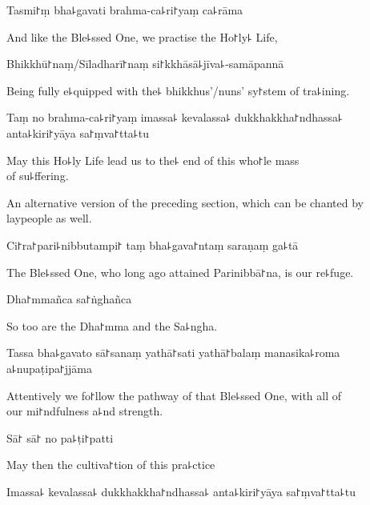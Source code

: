 Tasmi꜓ṃ bha꜕gavati brahma-ca꜕ri꜓yaṃ ca꜕rāma

\begin{english}
  And like the Ble꜕ssed One, we practise the Ho꜓ly꜕ Life,
\end{english}

Bhikkhū꜓naṃ/Sīladharī꜓naṃ si꜓kkhāsā꜕jīva꜕-samāpannā

\begin{english}
  Being fully e꜕quipped with the꜕ bhikkhus'/nuns' sy꜓stem of tra꜕ining.
\end{english}

Taṃ no brahma-ca꜕ri꜓yaṃ imassa꜕ kevalassa꜕ dukkhakkha꜓ndhassa꜕ anta꜕kiri꜓yāya sa꜓ṃva꜓tta꜕tu

\begin{english}
  May this Ho꜕ly Life lead us to the꜕ end of this who꜓le mass \\of su꜕ffering.
\end{english}

\begin{instruction}
  An alternative version of the preceding section, which can be chanted by laypeople as well.
\end{instruction}

Ci꜓ra꜓pari꜕nibbutampi꜓ taṃ bha꜕gava꜓ntaṃ saraṇaṃ ga꜕tā

\begin{english}
  The Ble꜕ssed One, who long ago attained Parinibbā꜓na, is our re꜕fuge.
\end{english}

Dha꜓mmañca sa꜓ṅghañca

\begin{english}
  So too are the Dha꜓mma and the Sa꜕ngha.
\end{english}

Tassa bha꜕gavato sā꜓sanaṃ yathā꜓sati yathā꜓balaṃ manasika꜕roma a꜕nupaṭipa꜓jjāma

\begin{english}
  Attentively we fo꜓llow the pathway of that Ble꜕ssed One, with all of \\our mi꜓ndfulness a꜕nd strength.
\end{english}

Sā꜓ sā꜓ no pa꜕ṭi꜓patti

\begin{english}
  May then the cultiva꜓tion of this pra꜕ctice
\end{english}

Imassa꜕ kevalassa꜕ dukkhakkha꜓ndhassa꜕ anta꜕kiri꜓yāya sa꜓ṃva꜓tta꜕tu

